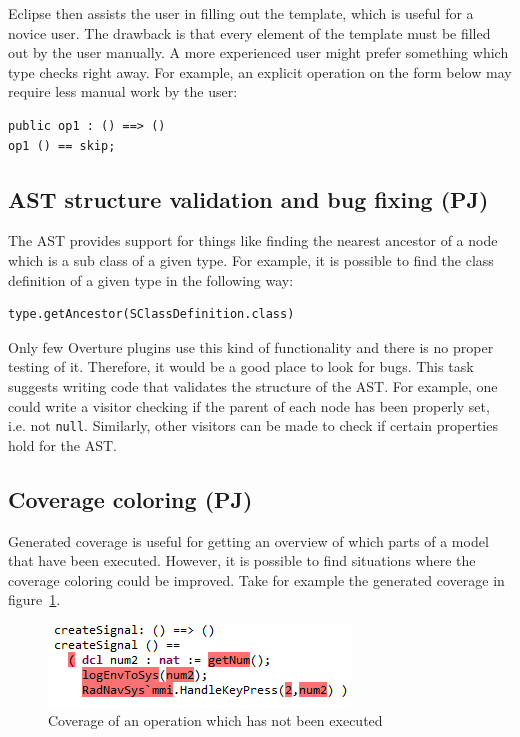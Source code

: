 \documentclass[11pt]{report}
\begin{document}
Eclipse then assists the user in filling out the template, which is useful for a novice user. The drawback is that every element of the template must be filled out by the user manually. A more experienced user might prefer something which type checks right away. For example, an explicit operation on the form below may require less manual work by the user:

\begin{lstlisting}
public op1 : () ==> ()
op1 () == skip;
\end{lstlisting}

\subsection*{AST structure validation and bug fixing (PJ)}

The AST provides support for things like finding the nearest ancestor of a node which is a sub class of a given type. For example, it is possible to find the class definition of a given type in the following way:

\begin{lstlisting}
type.getAncestor(SClassDefinition.class)
\end{lstlisting}

Only few Overture plugins use this kind of functionality and there is no proper testing of it. Therefore, it would be a good place to look for bugs. This task suggests writing code that validates the structure of the AST. For example, one could write a visitor checking if the parent of each node has been properly set, i.e. not \texttt{null}. Similarly, other visitors can be made to check if certain properties hold for the AST.

\subsection*{Coverage coloring (PJ)}

Generated coverage is useful for getting an overview of which parts of a model that have been executed. However, it is possible to find situations where the coverage coloring could be improved. Take for example the generated coverage in figure~\ref{figure:Coverage}.

\begin{figure}[!ht]
\centering
\includegraphics{figures/coverage}
\caption{Coverage of an operation which has not been executed}\label{figure:Coverage}
\end{figure}
\end{document}
